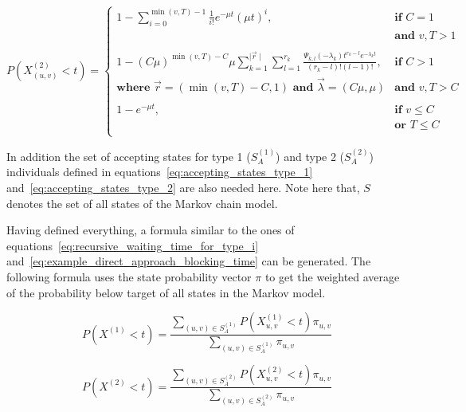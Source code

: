 \begin{equation}
    P(X_{(u,v)}^{(2)} < t) =
    \begin{cases}
        1 - \sum_{i=0}^{\min(v,T)-1} \frac{1}{i!} e^{-\mu t} (\mu t)^i,
            & \textbf{if } C = 1 \\
        & \textbf{and } v, T > 1 \\
        & \\
        1 - (C \mu ) ^ {\min(v,T) - C} \mu
            \sum_{k=1}^{\mid \vec{r} \mid} \sum_{l=1}^{r_k}
            \frac{\Psi_{k,l}(-\lambda_k)t^{r_k - l}
            e^{-\lambda_k t}}{(r_k - l)! (l - 1)!},
            & \textbf{if } C > 1 \\
        \textbf{where } \vec{r}=(\min(v, T) - C, 1) \textbf{ and }
            \vec{\lambda}=(C \mu, \mu) & \textbf{and } v, T  > C \\
        & \\
        1 - e^{-\mu t}, & \textbf{if } v \leq C \\
        & \textbf{or } T \leq C \\
    \end{cases}
\end{equation}
\normalsize

In addition the set of accepting states for type 1 (\(S_A^{(1)}\)) and type 2
(\(S_A^{(2)}\)) individuals defined in
equations~\eqref{eq:accepting_states_type_1}
and~\eqref{eq:accepting_states_type_2} are also needed here.
Note here that, \(S\) denotes the set of all states of the Markov chain model.


Having defined everything, a formula similar to the ones
of equations~\eqref{eq:recursive_waiting_time_for_type_i}
and~\eqref{eq:example_direct_approach_blocking_time} can be generated.
The following formula uses the state probability vector \(\pi\) to get the
weighted average of the probability below target of all states in the Markov
model.

\begin{equation}\label{eq:proportion_of_inds_type_1}
    P(X^{(1)} < t) = \frac{\sum_{(u,v) \in S_A^{(1)}} P(X_{u,v}^{(1)} < t)
    \pi_{u,v} }{\sum_{(u,v) \in S_A^{(1)}} \pi_{u,v}}
\end{equation}

\begin{equation}\label{eq:proportion_of_inds_type_2}
    P(X^{(2)} < t) = \frac{\sum_{(u,v) \in S_A^{(2)}} P(X_{u,v}^{(2)} < t)
    \pi_{u,v} }{\sum_{(u,v) \in S_A^{(2)}} \pi_{u,v}}
\end{equation}


